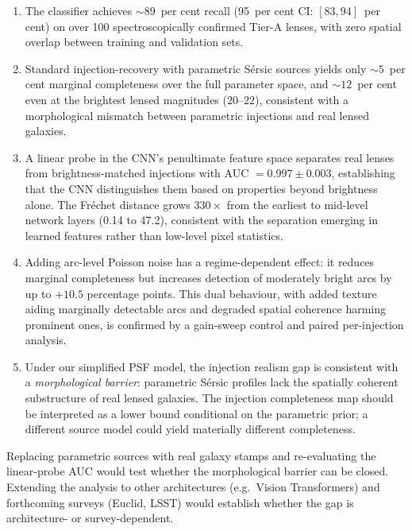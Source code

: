 \documentclass[fleqn,usenatbib]{mnras}
\begin{document}
\begin{enumerate}
\item[(i)] The classifier achieves $\sim\!89$~per cent recall (95~per cent CI: $[83, 94]$~per cent) on over 100 spectroscopically confirmed Tier-A lenses, with zero spatial overlap between training and validation sets.

\item[(ii)] Standard injection-recovery with parametric S\'{e}rsic sources yields only $\sim\!5$~per cent marginal completeness over the full parameter space, and $\sim\!12$~per cent even at the brightest lensed magnitudes ($20$--$22$), consistent with a morphological mismatch between parametric injections and real lensed galaxies.

\item[(iii)] A linear probe in the CNN's penultimate feature space separates real lenses from brightness-matched injections with AUC $= 0.997 \pm 0.003$, establishing that the CNN distinguishes them based on properties beyond brightness alone.  The Fr\'{e}chet distance grows $330\times$ from the earliest to mid-level network layers (0.14 to 47.2), consistent with the separation emerging in learned features rather than low-level pixel statistics.

\item[(iv)] Adding arc-level Poisson noise has a regime-dependent effect: it reduces marginal completeness but increases detection of moderately bright arcs by up to $+10.5$ percentage points.  This dual behaviour, with added texture aiding marginally detectable arcs and degraded spatial coherence harming prominent ones, is confirmed by a gain-sweep control and paired per-injection analysis.

\item[(v)] Under our simplified PSF model, the injection realism gap is consistent with a \emph{morphological barrier}: parametric S\'{e}rsic profiles lack the spatially coherent substructure of real lensed galaxies.  The injection completeness map should be interpreted as a lower bound conditional on the parametric prior; a different source model could yield materially different completeness.
\end{enumerate}

Replacing parametric sources with real galaxy stamps \citep[e.g.\ from HUDF, as in][]{Canameras2024} and re-evaluating the linear-probe AUC would test whether the morphological barrier can be closed.  Extending the analysis to other architectures (e.g.\ Vision Transformers) and forthcoming surveys (Euclid, LSST) would establish whether the gap is architecture- or survey-dependent.
\end{document}
